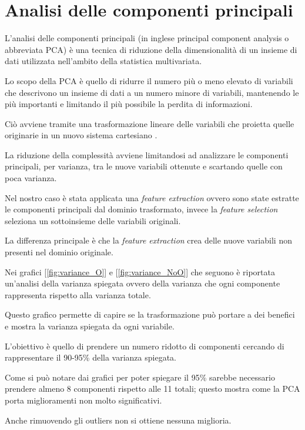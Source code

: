\section{Analisi delle componenti principali}
L'analisi delle componenti principali \cite{smith2002tutorial} (in inglese principal component analysis o abbreviata PCA) è una tecnica di riduzione della dimensionalità di un insieme di dati utilizzata nell'ambito della statistica multivariata.

\noindent
Lo scopo della PCA è quello di ridurre il numero più o meno elevato di variabili che descrivono un insieme di dati a un numero minore di variabili, mantenendo le più importanti e limitando il più possibile la perdita di informazioni.

\noindent
Ciò avviene tramite una trasformazione lineare delle variabili che proietta quelle originarie in un nuovo sistema cartesiano \cite{PCA_wikipedia}.

\noindent
La riduzione della complessità avviene limitandosi ad analizzare le componenti principali, per varianza, tra le nuove variabili ottenute e scartando quelle con poca varianza.

\noindent
Nel nostro caso è stata applicata una \textit{feature extraction} ovvero sono state estratte le componenti principali dal dominio trasformato, invece la \textit{feature selection} seleziona un sottoinsieme delle variabili originali.

\noindent
La differenza principale è che la \textit{feature extraction} crea delle nuove variabili non presenti nel dominio originale.

\noindent
Nei grafici [\ref{fig:variance_O}] e [\ref{fig:variance_NoO}] che seguono è riportata un'analisi della varianza spiegata ovvero della varianza che ogni componente rappresenta rispetto alla varianza totale.

\noindent
Questo grafico permette di capire se la trasformazione può portare a dei benefici e mostra la varianza spiegata da ogni variabile.

\noindent
L'obiettivo è quello di prendere un numero ridotto di componenti cercando di rappresentare il 90-95\% della varianza spiegata.

\noindent
Come si può notare dai grafici per poter spiegare il 95\% sarebbe necessario prendere almeno 8 componenti rispetto alle 11 totali; questo mostra come la PCA porta miglioramenti non molto significativi.

\noindent
Anche rimuovendo gli outliers non si ottiene nessuna miglioria.

